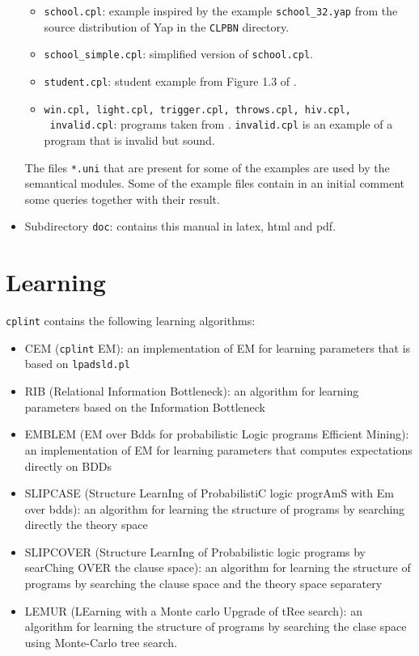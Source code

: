\documentclass[a4paper,10pt]{scrartcl}
\begin{document}
\begin{itemize}
\begin{itemize}
\item \texttt{school.cpl}: example inspired by the example \verb|school_32.yap| from the 
source distribution of Yap in the \texttt{CLPBN} directory.
\item \verb|school_simple.cpl|: simplified version of \texttt{school.cpl}.
\item \verb|student.cpl|: student example from Figure 1.3 of \cite{GetFri01-BC}.
\item \texttt{win.cpl, light.cpl, trigger.cpl, throws.cpl, hiv.cpl,}\\ \texttt{ invalid.cpl}: programs taken from \cite{DBLP:journals/tplp/VennekensDB09}. \texttt{invalid.cpl} is an example of a  program that is invalid but sound.
\end{itemize}
The files \texttt{*.uni} that are present for some of the examples are used  by the semantical modules. Some of the example files contain in an initial comment some queries together with their result.
\item Subdirectory \texttt{doc}: contains this manual in latex, html and pdf.
\end{itemize}

\section{Learning}
\texttt{cplint} contains the following learning algorithms:
\begin{itemize}
\item CEM (\texttt{cplint} EM): an implementation of EM for learning parameters that is based on \texttt{lpadsld.pl} \cite{RigDiM11-ML-IJ}
\item RIB (Relational Information Bottleneck): an algorithm for learning parameters based on the Information Bottleneck \cite{RigDiM11-ML-IJ}
\item EMBLEM (EM over Bdds for probabilistic Logic programs Efficient Mining): an implementation of EM for learning parameters that computes expectations directly on BDDs \cite{BelRig11-IDA,BelRig11-CILC11-NC,BelRig11-TR}
\item SLIPCASE (Structure LearnIng of ProbabilistiC logic progrAmS with Em over bdds): an algorithm for learning the structure of programs by searching directly the theory space \cite{BelRig11-ILP11-IC}
\item SLIPCOVER (Structure LearnIng of Probabilistic logic programs by searChing OVER the clause space): an algorithm for learning the structure of programs by searching the clause space and the theory space separatery \cite{BelRig13-TPLP-IJ}
\item LEMUR (LEarning with a Monte carlo Upgrade of tRee search): an algorithm 
for learning the structure of programs by searching the clase space using 
Monte-Carlo tree search.
\end{itemize}
\end{document}
